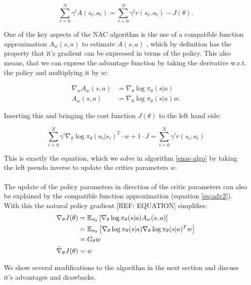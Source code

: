 \begin{equation}
	\sum_{t = 0}^{N}\gamma^t A(s_t, a_t) = \sum_{t = 0}^{N}\gamma^t r(s_t, a_t) - J(\theta).
\end{equation}

One of the key aspects of the NAC algorithm is the use of a compatible function approximation $A_w(s, a)$ to estimate $A(s, a)$ \citep{sutton2000policy}, which by definition has the property that it's gradient can be expressed in terms of the policy. This also means, that we can express the advantage function by taking the derivative w.r.t. the policy and multiplying it by $w$:

\begin{align}
	\nabla_w A_w(s,a) &= \nabla_{\theta} \log \pi_{\theta}(s|a)\label{eq:adv1}\\
	A_w(s,a) &= \nabla_{\theta} \log \pi_{\theta}(s|a)w. \label{eq:adv2}
\end{align}

 Inserting this and bringing the cost function $J(\theta)$ to the left hand side:

\begin{equation}
	\sum_{i = 0}^{N} \gamma^i \nabla_{\theta} \log \pi_{\theta}(a_i | s_i)^T \cdot w + 1 \cdot J = \sum_{i = 0}^{N}\gamma^i r(s_i, a_i)
\end{equation}

This is exactly the equation, which we solve in algorithm \ref{enac-algo} by taking the left pseudo inverse to update the critics parameters $w$.
\\\\
The update of the policy parameters in direction of the critic parameters can also be explained by the compatible function approximation (equation \ref{eq:adv2}). With this the natural policy gradient [REF: EQUATION] simplifies:
\begin{align}
\nabla_\theta J(\theta) &= \operatorname{\mathbb{E}}_{\pi_{\theta}} \left[\nabla_{\theta} \log \pi_{\theta}(s|a) A_w(s,a)\right]\\
&= \operatorname{\mathbb{E}}_{\pi_{\theta}}  \left[\nabla_{\theta} \log \pi_{\theta}(s|a) \nabla_{\theta} \log \pi_{\theta}(s|a)^T w\right]\\
&= G_\theta w\\
\widetilde{\nabla}_{\theta} J(\theta) &= w
\end{align}

We show several modifications to the algorithm in the next section and discuss it's advantages and drawbacks.


